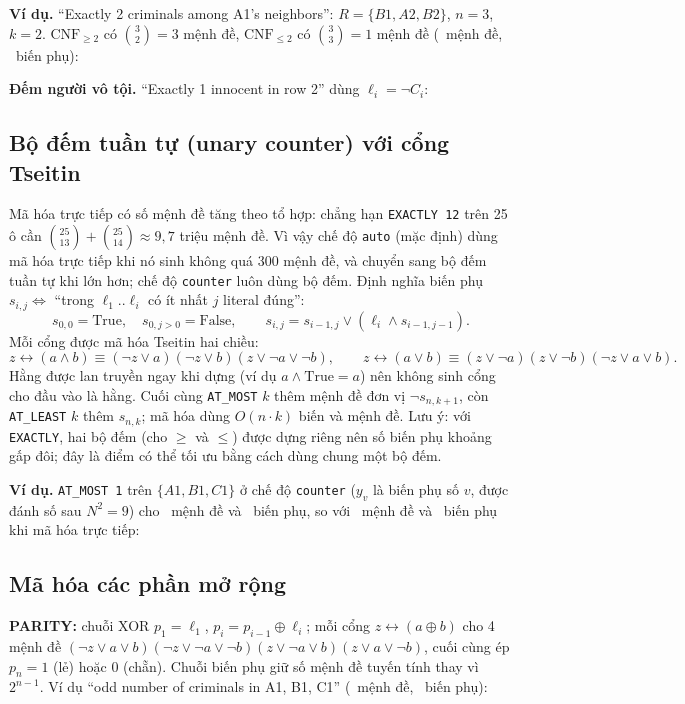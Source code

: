 \documentclass{article}
\newcommand{\code}[1]{\texttt{#1}}
\begin{document}
\textbf{Ví dụ.} ``Exactly 2 criminals among A1's neighbors'': $R = \{B1, A2, B2\}$, $n=3$, $k=2$. $\text{CNF}_{\ge 2}$ có $\binom{3}{2}=3$ mệnh đề, $\text{CNF}_{\le 2}$ có $\binom{3}{3}=1$ mệnh đề (\ExExactlyN\ mệnh đề, \ExExactlyAux\ biến phụ): \ExExactly

\textbf{Đếm người vô tội.} ``Exactly 1 innocent in row 2'' dùng $\ell_i = \neg C_i$: \ExExactlyInn

\subsection{Bộ đếm tuần tự (unary counter) với cổng Tseitin}
Mã hóa trực tiếp có số mệnh đề tăng theo tổ hợp: chẳng hạn \code{EXACTLY 12} trên 25 ô cần $\binom{25}{13}+\binom{25}{14} \approx 9{,}7$ triệu mệnh đề. Vì vậy chế độ \code{auto} (mặc định) dùng mã hóa trực tiếp khi nó sinh không quá 300 mệnh đề, và chuyển sang bộ đếm tuần tự khi lớn hơn; chế độ \code{counter} luôn dùng bộ đếm. Định nghĩa biến phụ $s_{i,j} \iff$ ``trong $\ell_1..\ell_i$ có ít nhất $j$ literal đúng'':
\begin{equation} s_{0,0} = \text{True},\quad s_{0,j>0} = \text{False},\qquad s_{i,j} = s_{i-1,j} \lor (\ell_i \land s_{i-1,j-1}). \end{equation}
Mỗi cổng được mã hóa Tseitin hai chiều:
\[ z \leftrightarrow (a \land b) \equiv (\neg z \lor a)(\neg z \lor b)(z \lor \neg a \lor \neg b), \qquad z \leftrightarrow (a \lor b) \equiv (z \lor \neg a)(z \lor \neg b)(\neg z \lor a \lor b). \]
Hằng được lan truyền ngay khi dựng (ví dụ $a \land \text{True} = a$) nên không sinh cổng cho đầu vào là hằng. Cuối cùng \code{AT\_MOST} $k$ thêm mệnh đề đơn vị $\neg s_{n,k+1}$, còn \code{AT\_LEAST} $k$ thêm $s_{n,k}$; mã hóa dùng $O(n\cdot k)$ biến và mệnh đề. Lưu ý: với \code{EXACTLY}, hai bộ đếm (cho $\ge$ và $\le$) được dựng riêng nên số biến phụ khoảng gấp đôi; đây là điểm có thể tối ưu bằng cách dùng chung một bộ đếm.

\textbf{Ví dụ.} \code{AT\_MOST 1} trên $\{A1,B1,C1\}$ ở chế độ \code{counter} ($y_v$ là biến phụ số $v$, được đánh số sau $N^2 = 9$) cho \ExAtMostCounterN\ mệnh đề và \ExAtMostCounterAux\ biến phụ, so với \ExAtMostDirectN\ mệnh đề và \ExAtMostDirectAux\ biến phụ khi mã hóa trực tiếp:
\ExAtMostCounter

\subsection{Mã hóa các phần mở rộng}
\textbf{PARITY:} chuỗi XOR $p_1 = \ell_1$, $p_i = p_{i-1} \oplus \ell_i$; mỗi cổng $z \leftrightarrow (a \oplus b)$ cho 4 mệnh đề $(\neg z\lor a\lor b)(\neg z\lor\neg a\lor\neg b)(z\lor\neg a\lor b)(z\lor a\lor\neg b)$, cuối cùng ép $p_n = 1$ (lẻ) hoặc $0$ (chẵn). Chuỗi biến phụ giữ số mệnh đề tuyến tính thay vì $2^{n-1}$. Ví dụ ``odd number of criminals in A1, B1, C1'' (\ExParityN\ mệnh đề, \ExParityAux\ biến phụ): \ExParity
\end{document}
